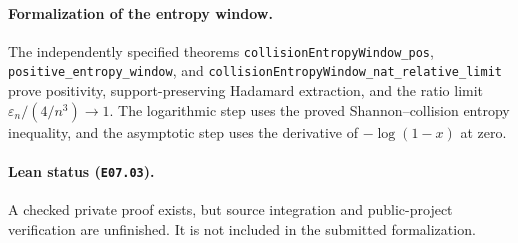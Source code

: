 \paragraph{Formalization of the entropy window.} The independently specified theorems \texttt{collision\allowbreak Entropy\allowbreak Window\_\allowbreak pos}, \texttt{positive\_\allowbreak entropy\_\allowbreak window}, and \texttt{collision\allowbreak Entropy\allowbreak Window\_\allowbreak nat\_\allowbreak relative\_\allowbreak limit} prove positivity, support-preserving Hadamard extraction, and the ratio limit $\varepsilon_n/(4/n^3)\to1$. The logarithmic step uses the proved Shannon--collision entropy inequality, and the asymptotic step uses the derivative of $-\log(1-x)$ at zero.

\paragraph{Lean status (\texttt{E07.03}).} A checked private proof exists, but source integration and public-project verification are unfinished. It is not included in the submitted formalization.

